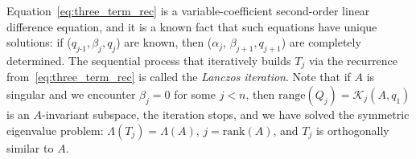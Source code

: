 \documentclass[10pt]{article}
\numberwithin{equation}{section}
\newcommand{\+}{%
	\raisebox{0.18ex}{\scaleobj{0.55}{+}}
}
\theoremstyle{definition}
\theoremstyle{definition}
\begin{document}
Equation~\eqref{eq:three_term_rec} is a variable-coefficient second-order linear difference equation, and it is a known fact that such equations have unique solutions: if ($q_{j\text{-}1}, \beta_j, q_j$) are known, then ($\alpha_j$, $\beta_{j+1}, q_{j+1}$) are completely determined. 
The sequential process that iteratively builds $T_j$ via the recurrence from~\eqref{eq:three_term_rec} is called the \emph{Lanczos iteration}. 
Note that if $A$ is singular and we encounter $\beta_j = 0$ for some $j < n$, then $\mathrm{range}(Q_j) = \mathcal{K}_j(A, q_1)$ is an $A$-invariant subspace, the iteration stops, and we have solved the symmetric eigenvalue problem: $\Lambda(T_j) = \Lambda(A)$, $j = \mathrm{rank}(A)$, and $T_j$ is orthogonally similar to $A$. 
\end{document}
